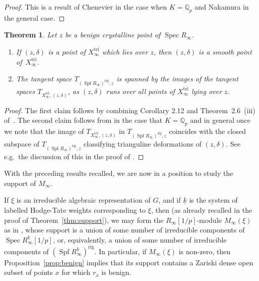\documentclass[11pt]{article}
\newtheorem{thm}[prop]{Theorem}
\theoremstyle{definition}
\DeclareMathOperator{\Spf}{Spf}
\DeclareMathOperator{\Spec}{Spec}
\newcommand{\Q}{\mathbb{Q}}
\newcommand\rig{\mathrm{rig}}
\newcommand\tri{\mathrm{tri}}
\begin{document}
\begin{proof}
This is a result
of Chenevier \cite[Lem.\,4.4]{Chenevier} in the case when $K = \Q_p$
and Nakamura \cite[Lem.\,4.2]{Nakamura} in the general case.
\end{proof}

\begin{thm}
\label{thm:infinite fern}
Let $z$ be a benign crystalline point of $\Spec R_{\infty}$.
\begin{enumerate}
\item
If $(z,\delta)$ is a point of $X^{\tri}_{\infty}$ which
lies over $z$, then $(z,\delta)$ is a smooth point
of~$X^{\tri}_{\infty}$.
\item The tangent space
$T_{(\Spf R_{\infty})^{\rig}, z}$ is spanned by the
images of the tangent spaces $T_{X^{\tri}_{\infty}, (z,\delta)}$,
as $(z,\delta)$ runs over
all points of $X^{\tri}_{\infty}$ lying over $z$.
\end{enumerate}
\end{thm}

\begin{proof}
The first claim follows by combining
Corollary 2.12 and Theorem~2.6~(iii)
of~\cite{BHS}.
The second claim follows from \cite{Chenevier} in the case that $K
= \Q_p$ and \cite[Th.\,2.62]{Nakamura2} in general once we note that the image
of
$T_{X^{\tri}_{\infty}, (z,\delta)}$
in $T_{(\Spf R_{\infty})^{\rig}, z}$ coincides with the closed subspace of
$T_{(\Spf R_{\infty})^{\rig}, z}$
classifying trianguline deformations of $(z,\delta)$. See e.g.\
the discussion of this in the proof of \cite[Th.\,2.6]{BHS}.
\end{proof}

With the preceding results recalled,
we are now in a position to study the support of $M_{\infty}$.

If $\xi$ is an irreducible algebraic representation of $G$,
and if $\underline{k}$ is the system of labelled
Hodge-Tate weights corresponding to $\xi$,
then (as already recalled in the proof of Theorem~\ref{thm:support}),
we may form the $R_{\infty}[1/p]$-module $M_{\infty}(\xi)$
as in \cite{six-authors}, whose support is a union of some
number of irreducible components of $\Spec R_{\infty}^{\underline{k}}
[1/p]$, or, equivalently,
a union of some number of irreducible components of
$(\Spf R_{\infty}^{\underline{k}})^{\rig}$.
In particular, if $M_{\infty}(\xi)$ is non-zero,
then Proposition~\ref{prop:benign} implies that its support contains a
Zariski dense open subset of points $x$ for which $r_x$ is benign.
\end{document}

